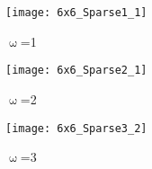 \begin{figure}[H] 
  \label{fig:grid_types2} 
  \begin{minipage}[b]{0.32\linewidth}
    \centering
    \texttt{[image: 6x6\_Sparse1\_1]}
    \caption{$\upomega$=1}
    \label{fig:obstGrid1}
    \vspace{1ex}
  \end{minipage}
  \begin{minipage}[b]{0.32\linewidth}
    \centering
    \texttt{[image: 6x6\_Sparse2\_1]}
    \caption{$\upomega$=2}
    \label{fig:obstGrid2}
    \vspace{1ex}%
  \end{minipage}
    \begin{minipage}[b]{0.32\linewidth}
    \centering
    \texttt{[image: 6x6\_Sparse3\_2]}
    \caption{$\upomega$=3}
    \label{fig:obstGrid3}
    \vspace{1ex}%
  \end{minipage}
\end{figure}